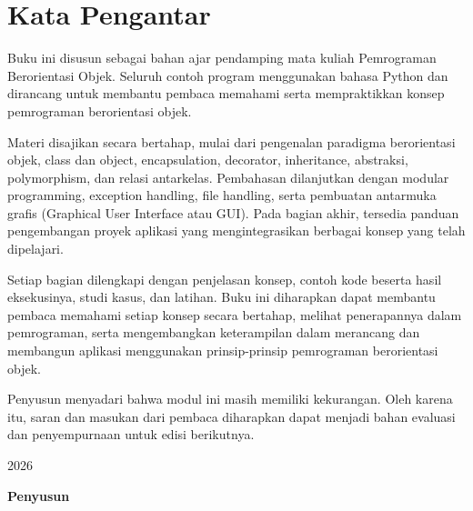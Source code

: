 \documentclass[11pt,a4paper,oneside,openany]{book}
\newcommand{\tahun}{2026}
\newcommand{\versiSampul}{formal2}
\begin{document}
\frontmatter
\pagestyle{empty}



\pagestyle{plain}
\subjudul{}
\chapter{Kata Pengantar}

Buku ini disusun sebagai bahan ajar pendamping mata kuliah Pemrograman Berorientasi Objek. Seluruh contoh program menggunakan bahasa Python dan dirancang untuk membantu pembaca memahami serta mempraktikkan konsep pemrograman berorientasi objek.

Materi disajikan secara bertahap, mulai dari pengenalan paradigma berorientasi objek, class dan object, encapsulation, decorator, inheritance, abstraksi, polymorphism, dan relasi antarkelas. Pembahasan dilanjutkan dengan modular programming, exception handling, file handling, serta pembuatan antarmuka grafis (Graphical User Interface atau GUI). Pada bagian akhir, tersedia panduan pengembangan proyek aplikasi yang mengintegrasikan berbagai konsep yang telah dipelajari.

Setiap bagian dilengkapi dengan penjelasan konsep, contoh kode beserta hasil eksekusinya, studi kasus, dan latihan. Buku ini diharapkan dapat membantu pembaca memahami setiap konsep secara bertahap, melihat penerapannya dalam pemrograman, serta mengembangkan keterampilan dalam merancang dan membangun aplikasi menggunakan prinsip-prinsip pemrograman berorientasi objek.

Penyusun menyadari bahwa modul ini masih memiliki kekurangan. Oleh karena itu, saran dan masukan dari pembaca diharapkan dapat menjadi bahan evaluasi dan penyempurnaan untuk edisi berikutnya.

\begin{flushright}
\tahun\par\vspace{14mm}
{\sffamily\bfseries Penyusun}
\end{flushright}

\clearpage
\tableofcontents

\mainmatter
\pagestyle{fancy}
\end{document}
